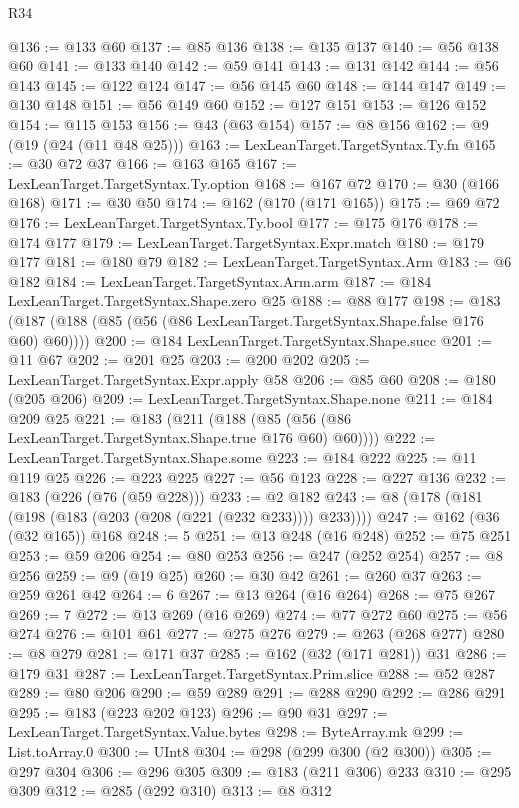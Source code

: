 \begin{lexlean}{R34}
\begin{coremodule}
@136 := @133 @60
@137 := @85 @136
@138 := @135 @137
@140 := @56 @138 @60
@141 := @133 @140
@142 := @59 @141
@143 := @131 @142
@144 := @56 @143
@145 := @122 @124
@147 := @56 @145 @60
@148 := @144 @147
@149 := @130 @148
@151 := @56 @149 @60
@152 := @127 @151
@153 := @126 @152
@154 := @115 @153
@156 := @43 (@63 @154)
@157 := @8 @156
@162 := @9 (@19 (@24 (@11 @48 @25)))
@163 := LexLeanTarget.TargetSyntax.Ty.fn
@165 := @30 @72 @37
@166 := @163 @165
@167 := LexLeanTarget.TargetSyntax.Ty.option
@168 := @167 @72
@170 := @30 (@166 @168)
@171 := @30 @50
@174 := @162 (@170 (@171 @165))
@175 := @69 @72
@176 := LexLeanTarget.TargetSyntax.Ty.bool
@177 := @175 @176
@178 := @174 @177
@179 := LexLeanTarget.TargetSyntax.Expr.match
@180 := @179 @177
@181 := @180 @79
@182 := LexLeanTarget.TargetSyntax.Arm
@183 := @6 @182
@184 := LexLeanTarget.TargetSyntax.Arm.arm
@187 := @184 LexLeanTarget.TargetSyntax.Shape.zero @25
@188 := @88 @177
@198 := @183 (@187 (@188 (@85 (@56 (@86 LexLeanTarget.TargetSyntax.Shape.false @176 @60) @60))))
@200 := @184 LexLeanTarget.TargetSyntax.Shape.succ
@201 := @11 @67
@202 := @201 @25
@203 := @200 @202
@205 := LexLeanTarget.TargetSyntax.Expr.apply @58
@206 := @85 @60
@208 := @180 (@205 @206)
@209 := LexLeanTarget.TargetSyntax.Shape.none
@211 := @184 @209 @25
@221 := @183 (@211 (@188 (@85 (@56 (@86 LexLeanTarget.TargetSyntax.Shape.true @176 @60) @60))))
@222 := LexLeanTarget.TargetSyntax.Shape.some
@223 := @184 @222
@225 := @11 @119 @25
@226 := @223 @225
@227 := @56 @123
@228 := @227 @136
@232 := @183 (@226 (@76 (@59 @228)))
@233 := @2 @182
@243 := @8 (@178 (@181 (@198 (@183 (@203 (@208 (@221 (@232 @233)))) @233))))
@247 := @162 (@36 (@32 @165)) @168
@248 := 5
@251 := @13 @248 (@16 @248)
@252 := @75 @251
@253 := @59 @206
@254 := @80 @253
@256 := @247 (@252 @254)
@257 := @8 @256
@259 := @9 (@19 @25)
@260 := @30 @42
@261 := @260 @37
@263 := @259 @261 @42
@264 := 6
@267 := @13 @264 (@16 @264)
@268 := @75 @267
@269 := 7
@272 := @13 @269 (@16 @269)
@274 := @77 @272 @60
@275 := @56 @274
@276 := @101 @61
@277 := @275 @276
@279 := @263 (@268 @277)
@280 := @8 @279
@281 := @171 @37
@285 := @162 (@32 (@171 @281)) @31
@286 := @179 @31
@287 := LexLeanTarget.TargetSyntax.Prim.slice
@288 := @52 @287
@289 := @80 @206
@290 := @59 @289
@291 := @288 @290
@292 := @286 @291
@295 := @183 (@223 @202 @123)
@296 := @90 @31
@297 := LexLeanTarget.TargetSyntax.Value.bytes
@298 := ByteArray.mk
@299 := List.toArray.{0}
@300 := UInt8
@304 := @298 (@299 @300 (@2 @300))
@305 := @297 @304
@306 := @296 @305
@309 := @183 (@211 @306) @233
@310 := @295 @309
@312 := @285 (@292 @310)
@313 := @8 @312

\end{coremodule}
\end{lexlean}
